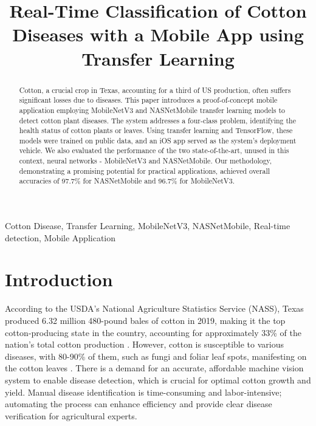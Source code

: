 \documentclass[conference]{IEEEtran}
\begin{document}
\title{Real-Time Classification of Cotton Diseases with a Mobile App using Transfer Learning \\}

\makeatletter
\newcommand{\linebreakand}{%
  \end{@IEEEauthorhalign}
  \hfill\mbox{}\par
  \mbox{}\hfill\begin{@IEEEauthorhalign}
}
\makeatother


\author{
}



\maketitle

\begin{abstract}
Cotton, a crucial crop in Texas, accounting for a third of US production, often suffers significant losses due to diseases. This paper introduces a proof-of-concept mobile application employing MobileNetV3 and NASNetMobile transfer learning models to detect cotton plant diseases. The system addresses a four-class problem, identifying the health status of cotton plants or leaves. Using transfer learning and TensorFlow, these models were trained on public data, and an iOS app served as the system's deployment vehicle. We also evaluated the performance of the two state-of-the-art, unused in this context, neural networks - MobileNetV3 and NASNetMobile. Our methodology, demonstrating a promising potential for practical applications, achieved overall accuracies of 97.7\% for NASNetMobile and 96.7\% for MobileNetV3.
\end{abstract}

\begin{IEEEkeywords}
 Cotton Disease, Transfer Learning, MobileNetV3, NASNetMobile, Real-time detection, Mobile Application
\end{IEEEkeywords}

\section{Introduction}
According to the USDA's National Agriculture Statistics Service (NASS), Texas produced 6.32 million 480-pound bales of cotton in 2019, making it the top cotton-producing state in the country, accounting for approximately 33\% of the nation's total cotton production \cite{ USDA-NASS}. However, cotton is susceptible to various diseases, with 80-90\% of them, such as fungi and foliar leaf spots, manifesting on the cotton leaves \cite{Gulhane-Gurjar}. There is a demand for an accurate, affordable machine vision system to enable disease detection, which is crucial for optimal cotton growth and yield. Manual disease identification is time-consuming and labor-intensive; automating the process can enhance efficiency and provide clear disease verification for agricultural experts.
\end{document}
